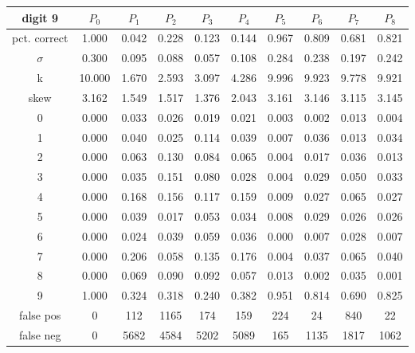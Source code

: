 \documentclass{report}
\begin{document}
\begin{tabular}{ | c ||  c | c | c | c | c | c | c | c | c |}
 digit 9 & $P_0$ & $P_1$ & $P_2$ & $P_3$ & $P_4$ & $P_5$ & $P_6$ & $P_7$ & $P_8$ \\
\hline \hline
pct. correct  & 1.000 & 0.042 & 0.228 & 0.123 & 0.144 & 0.967 & 0.809 & 0.681 & 0.821 \\
\hline
$\sigma$ & 0.300& 0.095& 0.088& 0.057& 0.108& 0.284& 0.238& 0.197& 0.242 \\
\hline
k & 10.000& 1.670& 2.593& 3.097& 4.286& 9.996& 9.923& 9.778& 9.921 \\
\hline
skew & 3.162& 1.549& 1.517& 1.376& 2.043& 3.161& 3.146& 3.115& 3.145 \\
\hline
0 & 0.000 & 0.033 & 0.026 & 0.019 & 0.021 & 0.003 & 0.002 & 0.013 & 0.004 \\
\hline
1 & 0.000 & 0.040 & 0.025 & 0.114 & 0.039 & 0.007 & 0.036 & 0.013 & 0.034 \\
\hline
2 & 0.000 & 0.063 & 0.130 & 0.084 & 0.065 & 0.004 & 0.017 & 0.036 & 0.013 \\
\hline
3 & 0.000 & 0.035 & 0.151 & 0.080 & 0.028 & 0.004 & 0.029 & 0.050 & 0.033 \\
\hline
4 & 0.000 & 0.168 & 0.156 & 0.117 & 0.159 & 0.009 & 0.027 & 0.065 & 0.027 \\
\hline
5 & 0.000 & 0.039 & 0.017 & 0.053 & 0.034 & 0.008 & 0.029 & 0.026 & 0.026 \\
\hline
6 & 0.000 & 0.024 & 0.039 & 0.059 & 0.036 & 0.000 & 0.007 & 0.028 & 0.007 \\
\hline
7 & 0.000 & 0.206 & 0.058 & 0.135 & 0.176 & 0.004 & 0.037 & 0.065 & 0.040 \\
\hline
8 & 0.000 & 0.069 & 0.090 & 0.092 & 0.057 & 0.013 & 0.002 & 0.035 & 0.001 \\
\hline
9 & 1.000 & 0.324 & 0.318 & 0.240 & 0.382 & 0.951 & 0.814 & 0.690 & 0.825 \\
\hline
false pos  & 0 & 112 & 1165 & 174 & 159 & 224 & 24 & 840 & 22 \\
\hline
false neg  & 0 & 5682 & 4584 & 5202 & 5089 & 165 & 1135 & 1817 & 1062 \\
\hline
\end{tabular}
\end{document}
